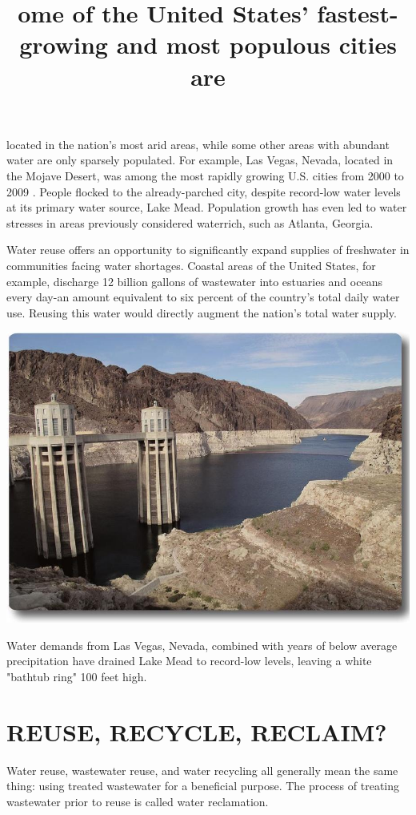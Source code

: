 \documentclass[10pt]{article}
\title{ome of the United States' fastest-growing and most populous cities are }
\author{}
\date{}
\begin{document}
\maketitle
located in the nation's most arid areas, while some other areas with abundant water are only sparsely populated. For example, Las Vegas, Nevada, located in the Mojave Desert, was among the most rapidly growing U.S. cities from 2000 to 2009 . People flocked to the already-parched city, despite record-low water levels at its primary water source, Lake Mead. Population growth has even led to water stresses in areas previously considered waterrich, such as Atlanta, Georgia.

Water reuse offers an opportunity to significantly expand supplies of freshwater in communities facing water shortages. Coastal areas of the United States, for example, discharge 12 billion gallons of wastewater into estuaries and oceans every day-an amount equivalent to six percent of the country's total daily water use. Reusing this water would directly augment the nation's total water supply.

\includegraphics[max width=\textwidth]{2022_11_05_93277ca2de7ec5580550g-01}

Water demands from Las Vegas, Nevada, combined with years of below average precipitation have drained Lake Mead to record-low levels, leaving a white "bathtub ring" 100 feet high.

\section{REUSE, RECYCLE, RECLAIM?}
Water reuse, wastewater reuse, and water recycling all generally mean the same thing: using treated wastewater for a beneficial purpose. The process of treating wastewater prior to reuse is called water reclamation.
\end{document}
